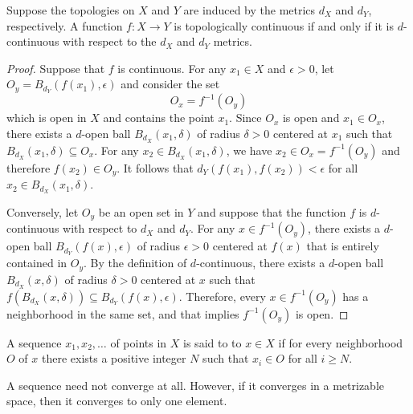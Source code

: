 \begin{theorem}
Suppose the topologies on $X$ and $Y$ are induced by the metrics $d_X$ and $d_Y$, respectively.
A function $f:X\to Y$ is topologically continuous if and only if it is $d$-continuous with respect to the $d_X$ and $d_Y$ metrics.
\end{theorem}
\begin{proof}
Suppose that $f$ is continuous.
For any $x_1 \in X$ and $\epsilon > 0$, let $O_y =  B_{d_Y} (f(x_1), \epsilon)$ and consider the set
\begin{equation*}
O_x = f^{-1} \left( O_y \right)
\end{equation*}
which is open in $X$ and contains the point $x_1$.
Since $O_x$ is open and $x_1 \in O_x$, there exists a $d$-open ball $B_{d_X} (x_1, \delta)$ of radius $\delta>0$ centered at $x_1$ such that $B_{d_X} (x_1, \delta) \subseteq O_x$.
For any $x_2\in B_{d_X}(x_1,\delta)$, we have $x_2\in O_x=f^{-1}(O_y)$ and therefore $f(x_2)\in O_y$.
It follows that $d_Y \left( f(x_1), f(x_2) \right) < \epsilon$ for all $x_2 \in B_{d_X} (x_1, \delta)$.

Conversely, let $O_y$ be an open set in $Y$ and suppose that the function $f$ is $d$-continuous with respect to $d_X$ and $d_Y$.
For any $x \in f^{-1} (O_y)$, there exists a $d$-open ball $B_{d_Y} (f(x), \epsilon)$ of radius $\epsilon>0$ centered at $f(x)$ that is entirely contained in $O_y$.
By the definition of $d$-continuous, there exists a $d$-open ball $B_{d_X} (x, \delta)$ of radius $\delta>0$ centered at $x$ such that $f \left( B_{d_X} (x,\delta) \right) \subseteq B_{d_Y} \left( f(x), \epsilon \right)$.
Therefore, every $x \in f^{-1}(O_y)$ has a neighborhood in the same set, and that implies $f^{-1} (O_y)$ is open.
\end{proof}

\begin{definition} \label{definition:SequenceConvergence}
A sequence $x_1, x_2, \ldots$ of points in $X$ is said to  to $x \in X$ if for every neighborhood $O$ of $x$ there exists a positive integer $N$ such that $x_i \in O$ for all $i \geq N$.
\end{definition}

A sequence need not converge at all.
However, if it converges in a metrizable space, then it converges to only one element.


